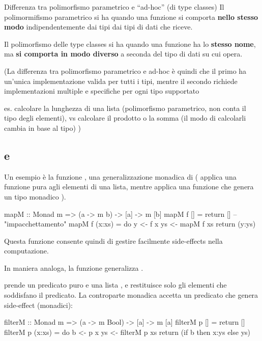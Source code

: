 \begin{gframe}{Differenza tra polimorfismo parametrico e ``ad-hoc'' (di type classes)}
    Il polimormifismo parametrico si ha quando una funzione si comporta \textbf{nello stesso modo} indipendentemente dai tipi dai tipi di dati che riceve.

    Il polimorfismo delle type classes si ha quando una funzione ha lo \textbf{stesso nome}, ma \textbf{si comporta in modo diverso} a seconda del tipo di dati su cui opera.
\end{gframe}

(La differenza tra polimorfismo parametrico e ad-hoc è quindi che il primo ha un'unica implementazione valida per tutti i tipi, mentre il secondo richiede implementazioni multiple e specifiche per ogni tipo supportato

es. calcolare la lunghezza di una lista (polimorfismo parametrico, non conta il tipo degli elementi), vs calcolare il prodotto o la somma (il modo di calcolarli cambia in base al tipo)
)

\subsection{ e }
Un esempio è la funzione , una generalizzazione monadica di  ( applica una funzione pura  agli elementi di una lista, mentre  applica una funzione che genera un tipo monadico ).

\begin{haskellbox}{}
mapM :: Monad m => (a -> m b) -> [a] -> m [b]
mapM f []     = return [] -- "impacchettamento"
mapM f (x:xs) = do y <- f x
                       ys <- mapM f xs
                       return (y:ys)
\end{haskellbox}

Questa funzione consente quindi di gestire facilmente side-effects nella computazione.

In maniera analoga, la funzione  generalizza .

 prende un predicato puro  e una lista \code{[a]}, e restituisce solo gli elementi che soddisfano il predicato. La controparte monadica  accetta un predicato che genera side-effect (monadici):

\begin{haskellbox}{}
filterM :: Monad m => (a -> m Bool) -> [a] -> m [a]
filterM p []     = return []
filterM p (x:xs) = do b  <- p x
                      ys <- filterM p xs
                      return (if b then x:ys else ys)
\end{haskellbox}

